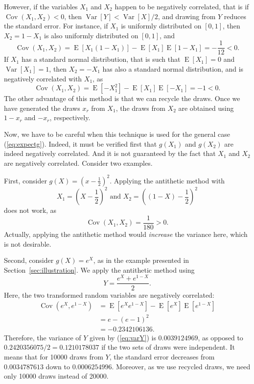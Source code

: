 \documentclass[12pt,a4paper]{article}
\newcommand{\req}[1]{(\ref{#1})}
\newcommand{\expect}{\operatorname{E}}
\newcommand{\var}{\operatorname{Var}}
\newcommand{\cov}{\operatorname{Cov}}
\begin{document}
 However, if the variables $X_1$ and
$X_2$ happen to be negatively correlated, that is if $\cov(X_1,X_2) <
0$, then $\var[Y] < \var[X] / 2$, and drawing from $Y$ reduces the
standard error. For instance, if $X_1$ is uniformly
distributed on $[0,1]$, then $X_2=1-X_1$ is also uniformly
distributed on $[0,1]$, and 
\begin{equation}
\cov(X_1,X_2)=\expect[X_1(1-X_1)]-\expect[X_1]\expect[1-X_1] =
-\frac{1}{12} < 0.
\end{equation}
If $X_1$ has a standard normal distribution, that is such that
$\expect[X_1]=0$ and $\var[X_1]=1$, then $X_2=-X_1$ has also a
standard normal distribution, and is 
negatively
correlated with $X_1$, as
\begin{equation}
\cov(X_1,X_2) = \expect[-X_1^2] - \expect[X_1]\expect[-X_1] = -1 < 0.
\end{equation}
The other advantage of this method is that we can recycle the
draws. Once we have generated the draws $x_r$ from $X_1$, the draws from $X_2$
are obtained using $1-x_r$ and $-x_r$, respectively. 

Now, we have to be careful when this technique is used for the general
case \req{eq:expectg}. Indeed, it must be verified first that $g(X_1)$
and $g(X_2)$ are indeed negatively correlated. And it is not
guaranteed by the fact that $X_1$ and $X_2$ are negatively
correlated. Consider two examples.

First, consider $g(X)=\left(x-\frac{1}{2} \right)^2$. Applying the
antithetic method with 
\begin{equation}
X_1 = \left(X-\frac{1}{2}\right)^2 \text{ and } X_2 = \left((1-X)-\frac{1}{2}\right)^2 
\end{equation}
does not work, as 
\begin{equation}
\cov(X_1,X_2) = \frac{1}{180} > 0.
\end{equation}
Actually, applying the antithetic method would \emph{increase} the
variance here, which is not desirable.

Second, consider $g(X)=e^X$, as in the example presented in
Section~\ref{sec:illustration}. We apply the antithetic method using 
\begin{equation}
Y = \frac{e^{X}+e^{1-X}}{2}.
\end{equation}
Here, the two transformed random variables are negatively correlated:
\begin{equation}
\begin{aligned}
\cov(e^X,e^{1-X}) &= \expect[e^X e^{1-X}] -
\expect[e^X]\expect[e^{1-X}] \\
 &= e - (e-1)^2 \\
 &= -0.2342106136.
\end{aligned}
\end{equation}
Therefore, the variance of $Y$ given by \req{eq:varY} is
$0.0039124969$, as opposed to $0.2420356075 / 2 = 0.1210178037$ if the
two sets of draws were independent. It means that for 10000 draws from
$Y$, the standard error decreases from $0.0034787613$ down to
$0.0006254996$. Moreover, as we use recycled draws, we need only 10000
draws instead of 20000. 
\end{document}
